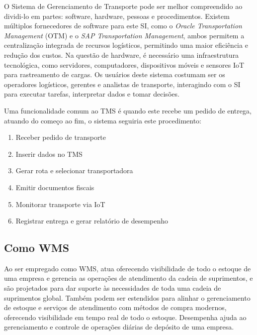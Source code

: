 \documentclass[conference]{IEEEtran}
\begin{document}
O Sistema de Gerenciamento de Transporte pode ser melhor compreendido ao dividi-lo em partes: software, hardware, pessoas e procedimentos. Existem múltiplos fornecedores de software para este SI, como o \textit{Oracle Transportation Management} (OTM) e o \textit{SAP Transportation Management}, ambos permitem a centralização integrada de recursos logísticos, permitindo uma maior eficiência e redução dos custos. Na questão de hardware, é necessário uma infraestrutura tecnológica, como servidores, computadores, dispositivos móveis e sensores IoT para rastreamento de cargas. Os usuários deste sistema costumam ser os operadores logísticos, gerentes e analistas de transporte, interagindo com o SI para executar tarefas, interpretar dados e tomar decisões.

Uma funcionalidade comum ao TMS é quando este recebe um pedido de entrega, atuando do começo ao fim, o sistema seguiria este procedimento:
\begin{enumerate}
    \item Receber pedido de transporte
    \item Inserir dados no TMS
    \item Gerar rota e selecionar transportadora
    \item Emitir documentos fiscais
    \item Monitorar transporte via IoT
    \item Registrar entrega e gerar relatório de desempenho
\end{enumerate}\cite{oracleTMS}\cite{sapTMS}
\subsection{Como WMS}
Ao ser empregado como WMS, atua oferecendo visibilidade de todo o estoque de uma empresa e gerencia as operações de atendimento da cadeia de suprimentos, e são projetados para dar suporte às necessidades de toda uma cadeia de suprimentos global. Também podem ser estendidos para alinhar o gerenciamento de estoque e serviços de atendimento com métodos de compra modernos, oferecendo visibilidade em tempo real de todo o estoque. Desempenha ajuda ao gerenciamento e controle de operações diárias de depósito de uma empresa.
\end{document}
